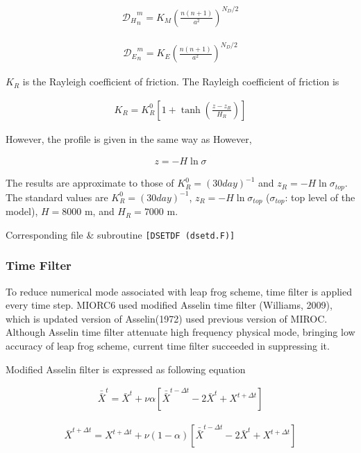 \begin{eqnarray}
  {{\mathcal D}_H}_n^m = K_M \left( \frac{n(n+1)}{a^2} \right)^{N_D/2}
\end{eqnarray}

\begin{eqnarray}
  {{\mathcal D}_E}_n^m = K_E \left( \frac{n(n+1)}{a^2} \right)^{N_D/2}
\end{eqnarray}

\(K_R\) is the Rayleigh coefficient of friction. The Rayleigh coefficient of friction is

\begin{eqnarray}
  K_R = K_R^0 \left[ 1+\tanh \left( \frac{z-z_R}{H_R} \right) \right]
\end{eqnarray}

However, the profile is given in the same way as However,

\begin{eqnarray}
  z = - H \ln \sigma
\end{eqnarray}

The results are approximate to those of \(K_R^0 = {(30day)}^{-1}\) and \(z_R = -H \ln \sigma_{top}\). The standard values are \(K_R^0 = {(30day)}^{-1}\), \(z_R = -H \ln \sigma_{top}\)
(\(\sigma_{top}\): top level of the model), \(H = 8000\) m, and \(H_R = 7000\) m.

Corresponding file \& subroutine \texttt{{[}DSETDF\ (dsetd.F){]}}

\hypertarget{time-filter}{%
\subsubsection{Time Filter}\label{time-filter}}

To reduce numerical mode associated with leap frog scheme, time filter is applied every time step. MIORC6 used modified Asselin time filter (Williams, 2009), which is updated version of Asselin(1972)
used previous version of MIROC. Although Asselin time filter attenuate high frequency physical mode, bringing low accuracy of leap frog scheme, current time filter succeeded in suppressing it.

Modified Asselin filter is expressed as following equation

\begin{eqnarray}
 \bar{\bar{X}}^t = \bar{X}^t + \nu\alpha[\bar{\bar{X}}^{t-\Delta t} -2 \bar{X}^t + X^{t+\Delta t}]
\end{eqnarray}

\begin{eqnarray}
 \bar{X}^{t+\Delta t} = X^{t+\Delta t} + \nu(1-\alpha)[\bar{\bar{X}}^{t-\Delta t} -2 \bar{X}^t + X^{t+\Delta t}]
\end{eqnarray}

